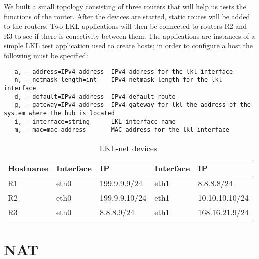 {{We built a small topology consisting of three routers that will help us tests the functions of the router. After the devices are started, static routes will be added to the routers. Two LKL applications will then be connected to routers R2 and R3 to see if there is conectivity between them. The applications are instances of a simple LKL test application used to create hosts; in order to configure a host the following must be specified: 
\begin{lstlisting}
  -a, --address=IPv4 address -IPv4 address for the lkl interface
  -n, --netmask-length=int   -IPv4 netmask length for the lkl interface
  -d, --default=IPv4 address -IPv4 default route
  -g, --gateway=IPv4 address -IPv4 gateway for lkl-the address of the system where the hub is located
  -i, --interface=string     -LKL interface name
  -m, --mac=mac address      -MAC address for the lkl interface
\end{lstlisting}

\begin{comment}
  -l, --lkl                  -means that this application uses LKL
  -p, --port=int             Port
  -r, --role=string          server/client
  -t, --to=Destination IPv4 address
                             IPv4 destination
\end{comment}

\begin{center}
  \begin{table}[htb]
  \begin{center}
  \begin{tabular}{| l | l | l | l | l |}
    \hline
      Hostname & Interface & IP & Interface & IP \\ \hline
      R1 & eth0 & 199.9.9.9/24 & eth1 & 8.8.8.8/24 \\ \hline
      R2 & eth0 & 199.9.9.10/24 & eth1 & 10.10.10.10/24\\ \hline
      R3 & eth0 & 8.8.8.9/24 & eth1 & 168.16.21.9/24 \\
    \hline
  \end{tabular}
  \end{center}
  \caption{LKL-net devices}
  \label{table:tdevices}
  \end{table}
\end{center}

\section{NAT}
\label{sub-sec:nat-impl}

}}
